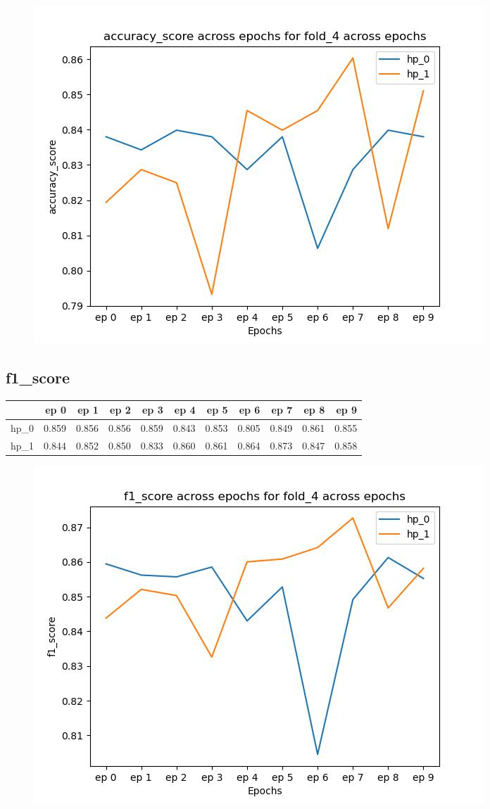 \documentclass{article}
\begin{document}
\begin{figure}[H]
\includegraphics[scale = 0.75]{fold_4/accuracy_score}
\end{figure}
\subsection{f1\_score}
\begin{tabular}{lrrrrrrrrrr}
\toprule
{} &   ep 0 &   ep 1 &   ep 2 &   ep 3 &   ep 4 &   ep 5 &   ep 6 &   ep 7 &   ep 8 &   ep 9 \\
\midrule
hp\_0 &  0.859 &  0.856 &  0.856 &  0.859 &  0.843 &  0.853 &  0.805 &  0.849 &  0.861 &  0.855 \\
hp\_1 &  0.844 &  0.852 &  0.850 &  0.833 &  0.860 &  0.861 &  0.864 &  0.873 &  0.847 &  0.858 \\
\bottomrule
\end{tabular}

\begin{figure}[H]
\includegraphics[scale = 0.75]{fold_4/f1_score}
\end{figure}
\end{document}
